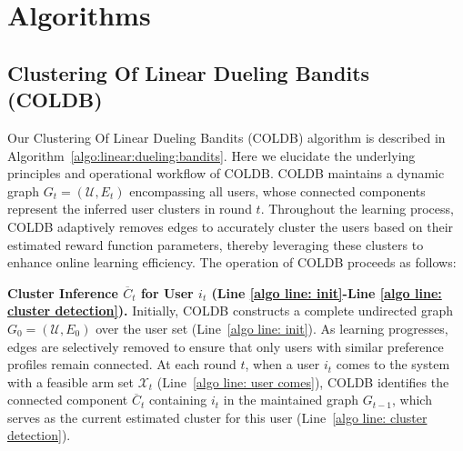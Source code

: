 \section{Algorithms}
\subsection{Clustering Of Linear Dueling Bandits (COLDB)}
\label{subsec:algo:coldb}
Our Clustering Of Linear Dueling Bandits (COLDB) algorithm is described in Algorithm~\ref{algo:linear:dueling:bandits}. Here we elucidate the underlying principles and operational workflow of COLDB.
COLDB maintains a dynamic graph $G_t = (\mathcal{U}, E_t)$ encompassing all users, whose connected components represent the inferred user clusters in round $t$. Throughout the learning process, COLDB adaptively removes edges to accurately cluster the users based on their estimated reward function parameters, thereby leveraging these clusters to enhance online learning efficiency. The operation of COLDB proceeds as follows:

\noindent\textbf{Cluster Inference $\overline{C}_t$ for User $i_t$ (Line \ref{algo line: init}-Line \ref{algo line: cluster detection}).} Initially, COLDB constructs a complete undirected graph $G_0 = (\mathcal{U}, E_0)$ over the user set (Line~\ref{algo line: init}). As learning progresses, edges are selectively removed to ensure that only users with similar preference profiles remain connected. At each round $t$, when a user $i_t$ comes to the system with a feasible arm set $\mathcal{X}_t$ (Line~\ref{algo line: user comes}), COLDB identifies the connected component $\overline{C}_t$ containing $i_t$ in the maintained graph $G_{t-1}$, which serves as the current estimated cluster for this user (Line~\ref{algo line: cluster detection}).

